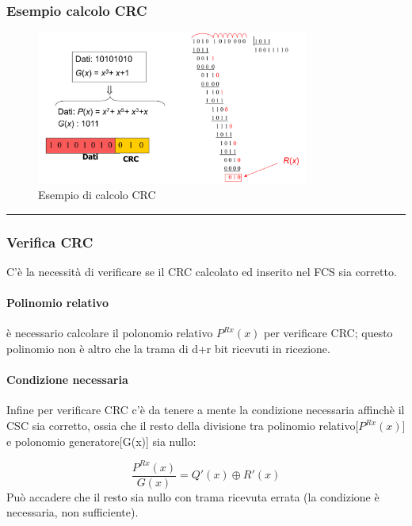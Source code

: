  \subsubsection{Esempio calcolo CRC}
    \begin{figure}[htbp]
        \centering
        \includegraphics[width=0.8\textwidth]{images/esempiocrc.png}
        \caption{Esempio di calcolo CRC}
        \label{fig:esempio-crc}
    \end{figure}

\vspace{0.3em}
\noindent\rule{\linewidth}{0.4pt}
\vspace{0.3em}

\subsubsection{Verifica CRC}

C'è la necessità di verificare se il CRC calcolato ed inserito nel FCS sia corretto.
\paragraph{Polinomio relativo} è necessario calcolare il polonomio relativo $P^{Rx}(x)$ per verificare CRC; questo polinomio non è altro che la trama di d+r bit ricevuti in ricezione.
\paragraph{Condizione necessaria}
Infine per verificare CRC c'è da tenere a mente la condizione necessaria affinchè il CSC sia corretto, ossia che il resto della divisione tra polinomio relativo[$P^{Rx}(x)$] e polonomio generatore[G(x)] sia nullo:

\begin{equation}
    \frac{P^{Rx}(x)}{G(x)} = Q'(x) \oplus R'(x)
\end{equation}
Può accadere che il resto sia nullo con trama ricevuta errata (la condizione è necessaria, non sufficiente). 

